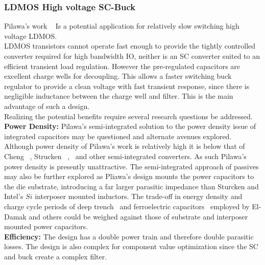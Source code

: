 \documentclass[letterpaper,twocolumn,10pt]{article}
\begin{document}
\subsubsection{LDMOS High voltage SC-Buck}
Pilawa's work ~\cite{Pilawa2012} Is a potential application for relatively slow switching high voltage LDMOS.\\
LDMOS transistors cannot operate fast enough to provide the tightly controlled converter required for high bandwidth IO, neither is an SC converter suited to an efficient transient load regulation. However the pre-regulated capacitors are excellent charge wells for decoupling. This allows a faster switching buck regulator to provide a clean voltage with fast transient response, since there is negligible inductance between the charge well and filter. This is the main advantage of such a design.\\
Realizing the potential benefits require several research questions be addressed.\\
\textbf{Power Density: }Pilawa's semi-integrated solution to the power density issue of integrated capacitors may be questioned and alternate avenues explored. Although power density of Pilawa's work is relatively high it is below that of Cheng ~\cite{Cheng2013}, Strucken ~\cite{Sturcken2012},~\cite{Sturcken2013} and other semi-integrated converters. As such Pilawa's power density is presently unattractive. The semi-integrated approach of passives may also be further explored as Pliawa's design mounts the power capacitors to the die substrate, introducing a far larger parasitic impedance than Sturcken and Intel's $Si$ interposer mounted inductors. The trade-off in energy density and charge cycle periods of deep trench~\cite{Pique2012} and ferroelectric capacitors~\cite{Damak2013} employed by El-Damak and others could be weighed against those of substrate and interposer mounted power capacitors.\\   
\textbf{Efficiency: }The design has a double power train and therefore double parasitic losses. The design is also complex for component value optimization since the SC and buck create a complex filter.\\  
\end{document}
